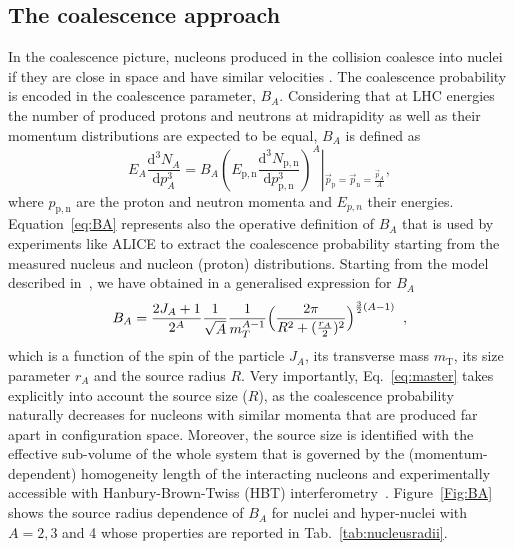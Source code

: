 \documentclass[a4paper,11pt]{article}
\begin{document}
\subsection{The coalescence approach}
In the coalescence picture, nucleons produced in the collision coalesce into nuclei if they are close in space and have similar velocities \cite{Butler:1963, Kapusta:1980, Scheibl:1998tk}.
The coalescence probability is encoded in the coalescence parameter, $B_{A}$.
Considering that at LHC energies the number of produced protons and neutrons at midrapidity as well as their momentum distributions are expected to be equal, $B_{A}$ is defined as
%
%
\begin{equation}
E_{A}\frac{\mathrm{d}^{3}N_{A}}{\mathrm{d}p_{A}^{3}}=B_{A}{\left(E_{\mathrm{p,n}}\frac{\mathrm{d}^{3}N_{\mathrm{p,n}}}{\mathrm{d}p_{\mathrm{p,n}}^{3}}\right)^{A}}\left\vert_{\vec{p}_{\mathrm{p}}=\vec{p}_{\mathrm{n}}=\frac{\vec{p}_{A}}{A}} \right.,
\label{eq:BA}
\end{equation}
%
%
where $p_{\mathrm{p,n}}$ are the proton and neutron momenta and $E_{p,n}$ their energies. 
Equation~\ref{eq:BA} represents also the operative definition of $B_A$ that is used by experiments like ALICE to extract the coalescence probability starting from the measured nucleus and nucleon (proton) distributions.
Starting from the model described in~\cite{Scheibl:1998tk, Blum:2017qnn}, we have obtained in \cite{Bellini:2018epz} a generalised expression for $B_A$
%
%
\begin{equation}\label{eq:master}
B_{A} = {2J_{A} + 1 \over 2^{A}} {1 \over \sqrt{A}} {1 \over m_{T}^{A-1}} \Bigl({2\pi \over R^2 + ({r_A \over 2})^2 }\Bigr)^{\frac{3}{2}(A-1)} \;\;,
\end{equation}
%
%
\noindent which is a function of the spin of the particle $J_A$, its transverse mass $m_{\mathrm{T}}$, its size parameter $r_A$ and the source radius $R$. Very importantly, Eq.~\ref{eq:master} takes explicitly into account the source size ($R$), as the coalescence probability naturally decreases for nucleons with similar momenta that are produced far apart in configuration space. 
Moreover, the source size is identified with the  effective sub-volume of the whole system that is governed by the (momentum-dependent) homogeneity length of the interacting nucleons and experimentally accessible with Hanbury-Brown-Twiss (HBT) interferometry~\cite{Scheibl:1998tk, Blum:2017qnn}. 
Figure~\ref{Fig:BA} shows the source radius dependence of $B_A$ for nuclei and hyper-nuclei with $A = 2, 3$ and 4 whose properties are reported in Tab.~\ref{tab:nucleusradii}. 
\end{document}
